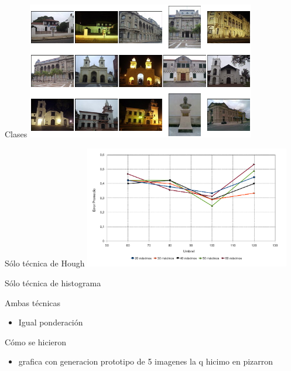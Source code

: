 \documentclass[spanish]{beamer}
\begin{document}
\begin{frame}{Clases}
\includegraphics[width=10cm]{img/mosaico.png} 
\end{frame}

\begin{frame}{Sólo técnica de Hough}
  \includegraphics[width=9cm]{../diagramas/estadistica_noche_iguales}
\end{frame}

\begin{frame}{Sólo técnica de histograma}
\end{frame}

\begin{frame}{Ambas técnicas}
  \begin{itemize}
  \item Igual ponderación
  \end{itemize}
\end{frame}

\begin{frame}{Cómo se hicieron}
  \begin{itemize}
  \item grafica con generacion prototipo de 5 imagenes la q hicimo en pizarron
  \end{itemize}
\end{frame}
\end{document}
